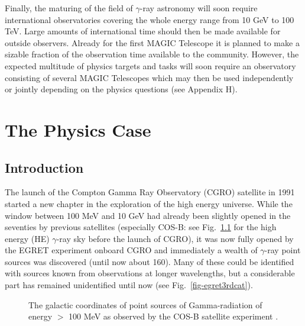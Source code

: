 Finally, the maturing of the field of $\gamma$-ray astronomy will soon
require international observatories 
covering the whole energy range from 10 GeV to 100 TeV. 
Large amounts of international time should then be made available
for outside observers. Already for the first MAGIC Telescope it is planned
to make a sizable fraction of the observation time available to the community.
However, the expected multitude of physics targets and tasks will soon require
an observatory consisting of several MAGIC Telescopes
which may then be used independently or jointly depending on the physics
questions (see Appendix H). 
\newpage
\begin{figure}[t]
\leavevmode
\centering
\epsfxsize=16cm
\end{figure}
\newpage
\setcounter{chapter}{1}

\chapter{The Physics Case}
\label{cha-physics}



\section{Introduction}

\medskip The launch of the Compton Gamma Ray Observatory (CGRO) satellite in 1991
started a new chapter in the exploration of the high energy universe. While
the window between 100 MeV and 10 GeV had already been slightly opened in
the seventies by previous satellites (especially COS-B: see Fig.~\ref{fig-cosb}
for the high energy (HE) $\gamma$-ray sky before the launch of CGRO), it was now fully
opened by the EGRET experiment onboard CGRO and immediately a wealth of
$\gamma$-ray point sources was discovered (until now about 160). Many of these
could be identified with sources known from observations at longer
wavelengths, but a considerable part has remained unidentified until now
(see Fig.~\ref{fig-egret3rdcat}).

\begin{figure}[htb] \centering \leavevmode
\epsfxsize=14cm
\caption{\label{fig-cosb}
The galactic coordinates of point sources of Gamma-radiation of energy
$>$ 100 MeV as observed by the COS-B satellite experiment
\protect\cite{cosb:91}.}
\end{figure}


